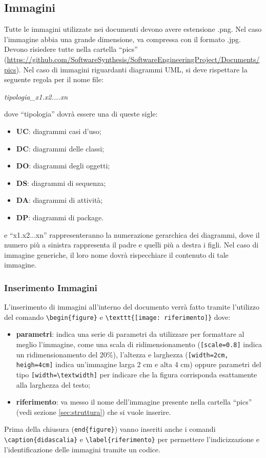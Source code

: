 \subsection{Immagini}
Tutte le immagini utilizzate nei documenti devono avere estensione .png. Nel caso l'immagine abbia una grande dimensione, va compressa con il formato .jpg. Devono risiedere tutte nella cartella ``pics'' (\url{https://github.com/SoftwareSynthesis/SoftwareEngineeringProject/Documents/pics}).
\newline
Nel caso di immagini riguardanti diagrammi UML, si deve rispettare la seguente regola per il nome file:
\begin{center}
\textit{tipologia\_x1.x2....xn}
\end{center}
dove ``tipologia'' dovrà essere una di queste sigle:
\begin{itemize}
\item \textbf{UC}: diagrammi casi d'uso;
\item \textbf{DC}: diagrammi delle classi;
\item \textbf{DO}: diagrammi degli oggetti;
\item \textbf{DS}: diagrammi di sequenza;
\item \textbf{DA}: diagrammi di attività;
\item \textbf{DP}: diagrammi di package.
\end{itemize}
e ``x1.x2...xn'' rappresenteranno la numerazione gerarchica dei diagrammi, dove il numero più a sinistra rappresenta il padre e quelli più a destra i figli.
\newline
Nel caso di immagine generiche, il loro nome dovrà rispecchiare il contenuto di tale immagine.

\subsubsection{Inserimento Immagini}
L'inserimento di immagini all'interno del documento verrà fatto tramite l'utilizzo del comando \verb+\begin{figure}+ e \verb+\texttt{[image: riferimento]}+ dove:
\begin{itemize}
\item \textbf{parametri}: indica una serie di parametri da utilizzare per formattare al meglio l'immagine, come una scala di ridimensionamento (\verb+[scale=0.8]+ indica un ridimensionamento del 20\%), l'altezza e larghezza (\verb+[width=2cm, heigh=4cm]+ indica un'immagine larga 2 cm e alta 4 cm) oppure parametri del tipo \verb+[width=\textwidth]+ per indicare che la figura corrisponda esattamente alla larghezza del testo;
\item \textbf{riferimento}: va messo il nome dell'immagine presente nella cartella ``pics'' (vedi sezione \ref{sec:struttura}) che si vuole inserire.
\end{itemize}
Prima della chiusura (\verb+end{figure}+) vanno inseriti anche i comandi \verb+\caption{didascalia}+ e \verb+\label{riferimento}+ per permettere l'indicizzazione e l'identificazione delle immagini tramite un codice.

